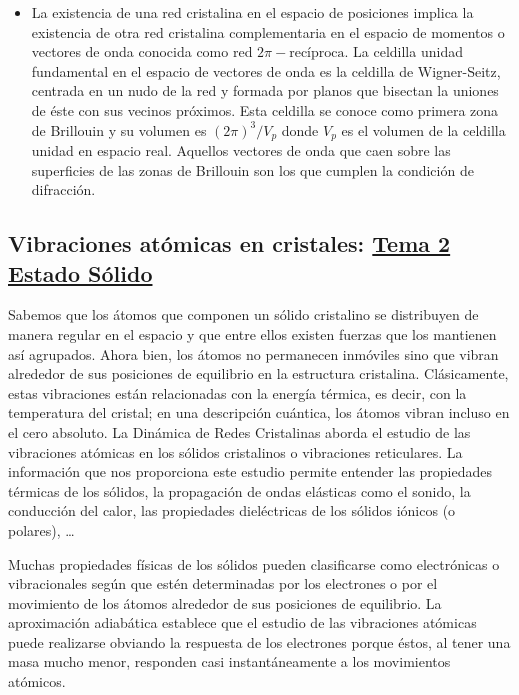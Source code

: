 \documentclass[11pt]{article}
\begin{document}
\begin{itemize}
\item La existencia de una red cristalina en el espacio de posiciones implica la existencia de otra red cristalina complementaria en el espacio de momentos o vectores de onda conocida como red \(2\pi-\text{recíproca}\). La celdilla unidad fundamental en el espacio de vectores de onda es la celdilla de Wigner-Seitz, centrada en un nudo de la red y formada por planos que bisectan la uniones de éste con sus vecinos próximos. Esta celdilla se conoce como primera zona de Brillouin y su volumen es \((2\pi)^3/V_p\) donde \(V_p\) es el volumen de la celdilla unidad en espacio real. Aquellos vectores de onda que caen sobre las superficies de las zonas de Brillouin son los que cumplen la condición de difracción.
\end{itemize}

\subsection{Vibraciones atómicas en cristales: \href{Tema2\_Estado\_Solido.pdf}{Tema 2 Estado Sólido}}
\label{sec:org6c9807a}

Sabemos que los átomos que componen un sólido cristalino se distribuyen de manera regular en el espacio y que entre ellos existen fuerzas que los mantienen así agrupados. Ahora bien, los átomos no permanecen inmóviles sino que vibran alrededor de sus posiciones de equilibrio en la estructura cristalina. Clásicamente, estas vibraciones están relacionadas con la energía térmica, es decir, con la temperatura del cristal; en una descripción cuántica, los átomos vibran incluso en el cero absoluto. La Dinámica de Redes Cristalinas aborda el estudio de las vibraciones atómicas en los sólidos cristalinos o
vibraciones reticulares. La información que nos proporciona este estudio permite entender las propiedades térmicas de los sólidos, la propagación de ondas elásticas como el sonido, la conducción del calor, las propiedades dieléctricas de los sólidos iónicos (o polares), \ldots{}

Muchas propiedades físicas de los sólidos pueden clasificarse como electrónicas o vibracionales según que estén determinadas por los electrones o por el movimiento de los átomos alrededor de sus posiciones de equilibrio.
La aproximación adiabática establece que el estudio de las vibraciones atómicas puede realizarse obviando la respuesta de los electrones porque éstos, al tener una masa mucho menor, responden casi instantáneamente a los movimientos atómicos.
\end{document}
